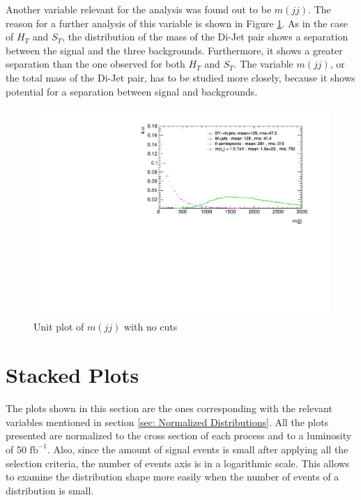 Another variable relevant for the analysis was found out to be $m(jj)$. The reason for a further analysis of this variable is shown in Figure \ref{fig: mjjUnitNC}. As in the case of $H_{T}$ and $S_{T}$, the distribution of the mass of the Di-Jet pair shows a separation between the signal and the three backgrounds. Furthermore, it shows a greater separation than the one observed for both $H_{T}$ and $S_{T}$. The variable $m(jj)$, or the total mass of the Di-Jet pair, has to be studied more closely, because it shows potential for a separation between signal and backgrounds.

\begin{figure}
\centering
\includegraphics[width=\linewidth]{Plots/mjj_unitNC.pdf}
\caption{Unit plot of $m(jj)$ with no cuts}
\label{fig: mjjUnitNC}
\end{figure}


\section{Stacked Plots}\label{section: stackPlots}

The plots shown in this section are the ones corresponding with the relevant variables mentioned in section \ref{sec: Normalized Distributions}. All the plots presented are normalized to the cross section of each process and to a luminosity of 50 $\text{fb}^{-1}$. Also, since the amount of signal events is small after applying all the selection criteria, the number of events axis is in a logarithmic scale. This allows to examine the distribution shape more easily when the number of events of a distribution is small. 

